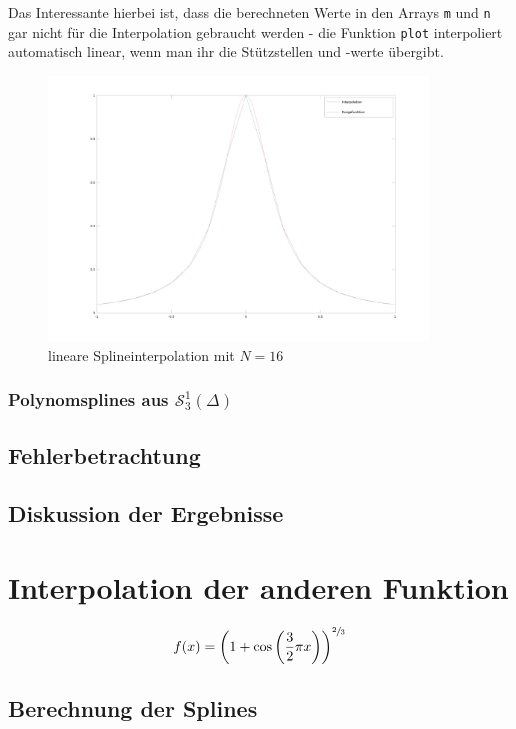 \documentclass[ngerman,a4paper]{texmf/tex/latex/mathscript/mathscript}
\begin{document}
	Das Interessante hierbei ist, dass die berechneten Werte in den Arrays \texttt{m} und \texttt{n} gar nicht für die Interpolation gebraucht werden - die Funktion \texttt{plot} interpoliert automatisch linear, wenn man ihr die Stützstellen und -werte übergibt.
	
	\begin{figure}[h]
		\centering
		\includegraphics[width=0.9\textwidth]{images/Runge_lineare_Interpolation.png}
		\caption{lineare Splineinterpolation mit $N=16$}
	\end{figure}
	
	\subsubsection{Polynomsplines aus $\mathcal{S}_3^1(\Delta)$}
	
	\subsection{Fehlerbetrachtung}
	
	\subsection{Diskussion der Ergebnisse}


\section{Interpolation der anderen Funktion}
	\begin{align}
		f(x) = \left( 1+\cos\left(\frac{3}{2}\pi x \right) \right)^{\sfrac{2}{3}}\notag
	\end{align}
	
	\subsection{Berechnung der Splines}
\end{document}
